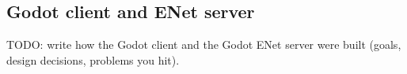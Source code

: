 \IfFileExists{IEEEtran.cls}{\ieeetrue\documentclass[conference]{IEEEtran}}{\ieeefalse\documentclass[twocolumn,10pt]{article}}
\begin{document}
\subsection{Godot client and ENet server}
TODO: write how the Godot client and the Godot ENet server were built (goals, design decisions, problems you hit).
\end{document}
